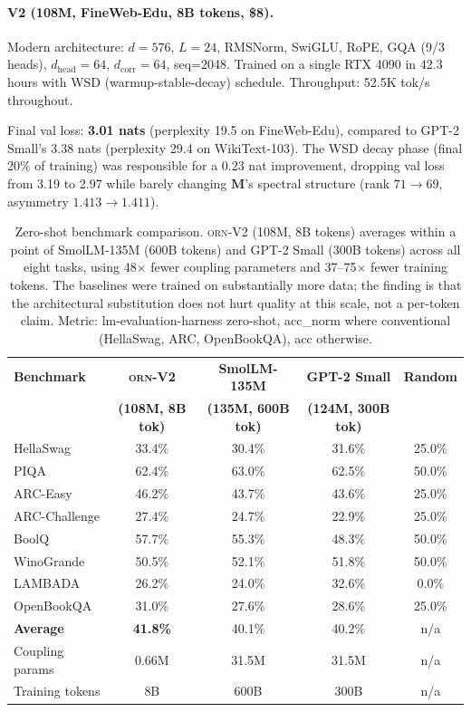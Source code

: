 \documentclass[10pt,twocolumn]{article}
\newcommand{\M}{\mathbf{M}}
\newcommand{\orn}{\textsc{orn}}
\begin{document}
\paragraph{V2 (108M, FineWeb-Edu, 8B tokens, \$8).}
Modern architecture: $d{=}576$, $L{=}24$, RMSNorm, SwiGLU, RoPE, GQA (9/3 heads), $d_\text{head}{=}64$, $d_\text{corr}{=}64$, seq=2048.
Trained on a single RTX 4090 in 42.3 hours with WSD (warmup-stable-decay) schedule.
Throughput: 52.5K tok/s throughout.

Final val loss: \textbf{3.01 nats} (perplexity 19.5 on FineWeb-Edu), compared to GPT-2 Small's 3.38 nats (perplexity 29.4 on WikiText-103).
The WSD decay phase (final 20\% of training) was responsible for a 0.23 nat improvement, dropping val loss from 3.19 to 2.97 while barely changing $\M$'s spectral structure (rank $71 \to 69$, asymmetry $1.413 \to 1.411$).

\begin{table}[t]
\centering\footnotesize
\begin{tabular}{@{}lcccc@{}}
\toprule
\textbf{Benchmark} & \textbf{\orn{}-V2} & \textbf{SmolLM-135M} & \textbf{GPT-2 Small} & \textbf{Random} \\
& \textbf{(108M, 8B tok)} & \textbf{(135M, 600B tok)} & \textbf{(124M, 300B tok)} & \\
\midrule
HellaSwag     & 33.4\% & 30.4\% & 31.6\% & 25.0\% \\
PIQA          & 62.4\% & 63.0\% & 62.5\% & 50.0\% \\
ARC-Easy      & 46.2\% & 43.7\% & 43.6\% & 25.0\% \\
ARC-Challenge & 27.4\% & 24.7\% & 22.9\% & 25.0\% \\
BoolQ         & 57.7\% & 55.3\% & 48.3\% & 50.0\% \\
WinoGrande    & 50.5\% & 52.1\% & 51.8\% & 50.0\% \\
LAMBADA       & 26.2\% & 24.0\% & 32.6\% & 0.0\%  \\
OpenBookQA    & 31.0\% & 27.6\% & 28.6\% & 25.0\% \\
\midrule
\textbf{Average}  & \textbf{41.8\%} & 40.1\% & 40.2\% & n/a \\
Coupling params   & 0.66M & 31.5M & 31.5M & n/a \\
Training tokens   & 8B    & 600B  & 300B  & n/a \\
\bottomrule
\end{tabular}
\caption{Zero-shot benchmark comparison. \orn{}-V2 (108M, 8B tokens) averages within a point of SmolLM-135M (600B tokens) and GPT-2 Small (300B tokens) across all eight tasks, using 48$\times$ fewer coupling parameters and 37--75$\times$ fewer training tokens. The baselines were trained on substantially more data; the finding is that the architectural substitution does not hurt quality at this scale, not a per-token claim. Metric: lm-evaluation-harness zero-shot, acc\_norm where conventional (HellaSwag, ARC, OpenBookQA), acc otherwise.}
\label{tab:benchmarks}
\end{table}
\end{document}
